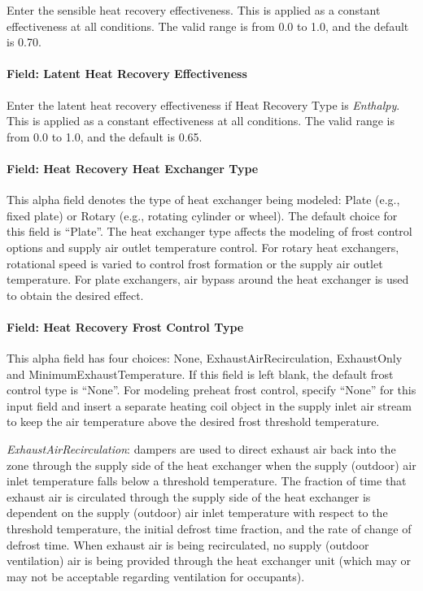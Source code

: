 Enter the sensible heat recovery effectiveness. This is applied as a constant effectiveness at all conditions. The valid range is from 0.0 to 1.0, and the default is 0.70.

\paragraph{Field: Latent Heat Recovery Effectiveness}\label{field-latent-heat-recovery-effectiveness-7}

Enter the latent heat recovery effectiveness if Heat Recovery Type is \emph{Enthalpy}. This is applied as a constant effectiveness at all conditions. The valid range is from 0.0 to 1.0, and the default is 0.65.

\paragraph{Field: Heat Recovery Heat Exchanger Type}\label{field-heat-recovery-heat-exchanger-type-2}

This alpha field denotes the type of heat exchanger being modeled: Plate (e.g., fixed plate) or Rotary (e.g., rotating cylinder or wheel). The default choice for this field is ``Plate''. The heat exchanger type affects the modeling of frost control options and supply air outlet temperature control. For rotary heat exchangers, rotational speed is varied to control frost formation or the supply air outlet temperature. For plate exchangers, air bypass around the heat exchanger is used to obtain the desired effect.

\paragraph{Field: Heat Recovery Frost Control Type}\label{field-heat-recovery-frost-control-type-2}

This alpha field has four choices: None, ExhaustAirRecirculation, ExhaustOnly and MinimumExhaustTemperature. If this field is left blank, the default frost control type is ``None''. For modeling preheat frost control, specify ``None'' for this input field and insert a separate heating coil object in the supply inlet air stream to keep the air temperature above the desired frost threshold temperature.

\emph{ExhaustAirRecirculation}: dampers are used to direct exhaust air back into the zone through the supply side of the heat exchanger when the supply (outdoor) air inlet temperature falls below a threshold temperature. The fraction of time that exhaust air is circulated through the supply side of the heat exchanger is dependent on the supply (outdoor) air inlet temperature with respect to the threshold temperature, the initial defrost time fraction, and the rate of change of defrost time. When exhaust air is being recirculated, no supply (outdoor ventilation) air is being provided through the heat exchanger unit (which may or may not be acceptable regarding ventilation for occupants).

